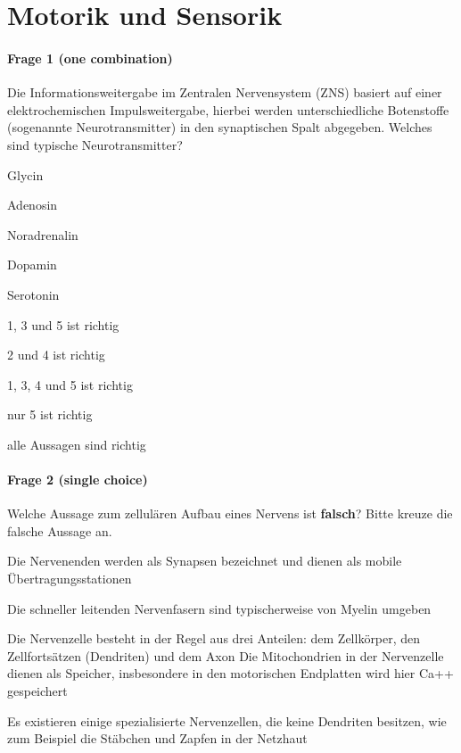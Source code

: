 \section*{Motorik und Sensorik}

\paragraph{Frage 1 (one combination)}

Die Informationsweitergabe im Zentralen Nervensystem (ZNS) basiert auf einer elektrochemischen Impulsweitergabe, hierbei werden unterschiedliche Botenstoffe (sogenannte Neurotransmitter) in den synaptischen Spalt abgegeben. Welches sind typische Neurotransmitter?

\begin{minipage}{.5\linewidth}
  \begin{benumerate}
    \item Glycin
    \item Adenosin
    \item Noradrenalin
    \item Dopamin
    \item Serotonin
  \end{benumerate}
\end{minipage}
\hfill
\begin{minipage}{.5\linewidth}
  \begin{checklist}
    \item 1, 3 und 5 ist richtig
    \item 2 und 4 ist richtig
    \item 1, 3, 4 und 5 ist richtig
    \item nur 5 ist richtig
    \item[\checkedbox] alle Aussagen sind richtig
  \end{checklist}
\end{minipage}

\paragraph{Frage 2 (single choice)}

Welche Aussage zum zellulären Aufbau eines Nervens ist \textbf{falsch}? Bitte kreuze die falsche Aussage an.
\begin{benumerate}
  \item Die Nervenenden werden als Synapsen bezeichnet und dienen als mobile Übertragungsstationen
  \item Die schneller leitenden Nervenfasern sind typischerweise von Myelin umgeben
  \item Die Nervenzelle besteht in der Regel aus drei Anteilen: dem Zellkörper, den Zellfortsätzen (Dendriten) und dem Axon
  \bolditem Die Mitochondrien in der Nervenzelle dienen als Speicher, insbesondere in den motorischen Endplatten wird hier Ca++ gespeichert
  \item Es existieren einige spezialisierte Nervenzellen, die keine Dendriten besitzen, wie zum Beispiel die Stäbchen und Zapfen in der Netzhaut
\end{benumerate}

